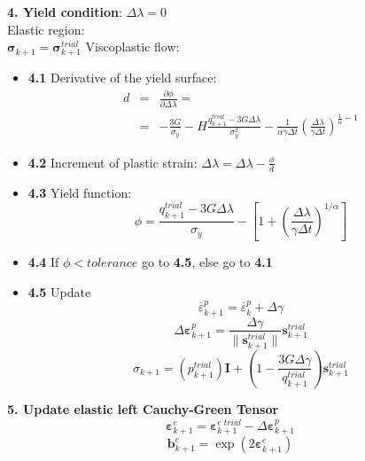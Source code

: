 \documentclass[applsci,journal,article,submit,moreauthors,pdftex]{Definitions/mdpi}
\begin{document}
\begin{algorithm}
\begin{algorithmic}
\textbf{4. Yield condition}: $\Delta\lambda=0$\\
 Elastic region:\\
\vspace{0.15cm}
$\mathbf{\sigma}_{k+1}=\mathbf{\sigma}^{trial}_{k+1}$
\vspace{0.3cm}
\ELSE   Viscoplastic flow:
\begin{itemize}
\item\textbf{4.1} Derivative of the yield surface:
\begin{eqnarray}
d&=&\frac{\partial\phi}{\partial\Delta\lambda}=\nonumber\\
&=&- \frac{3G}{\sigma_y} - H \frac{q^{trial}_{k+1}  - 3G\Delta\lambda}{\sigma^2_y} - \frac{1}{\alpha\gamma\Delta t}\left( \frac{\Delta \lambda}{\gamma \Delta  t} \right)^{\frac{1}{\alpha}-1}\nonumber
\end{eqnarray}
\item\textbf{4.2} Increment of plastic strain:
$
\Delta\lambda=\Delta\lambda-\frac{\phi}{d}
$
\item\textbf{4.3} Yield function:
$$
\phi= \frac{q^{trial}_{k+1}  - 3G\Delta\lambda}{\sigma_y} -\left[  1 + \left( \frac{\Delta \lambda}{\gamma \Delta  t} \right)^{1/\alpha} \right]
$$
\item\textbf{4.4} If $\phi < tolerance$ go to \textbf{4.5}, else go to  \textbf{4.1}
\item\textbf{4.5} Update
$$
\overline{\varepsilon}^p_{k+1}=\overline{\varepsilon}^p_{k}+\Delta\gamma
$$
$$
\Delta\boldsymbol{\varepsilon}_{k+1}^{p}= \frac{\Delta\gamma}{\|\textbf{s}^{trial}_{k+1}\|}\mathbf{s}^{trial}_{k+1}
$$
$$
\sigma_{k+1}=\left(p^{trial}_{k+1} \right)\mathbf{I}+\left(1-\frac{3G\Delta\gamma}{q^{trial}_{k+1} }\right)\textbf{s}^{trial}_{k+1}
$$
\end{itemize}
\ENDIF
%
\State \textbf{5. Update elastic left Cauchy-Green Tensor}
$$
\boldsymbol{\varepsilon}_{k+1}^{e}= \boldsymbol{\varepsilon}^{e\; trial}_{k+1}-\Delta\boldsymbol{\varepsilon}_{k+1}^{p}
$$
$$
\mathbf{b}_{k+1}^{e}=\exp (2 \boldsymbol{\varepsilon}_{k+1}^{e})
$$
\end{algorithmic}
\end{algorithm}

\end{document}
